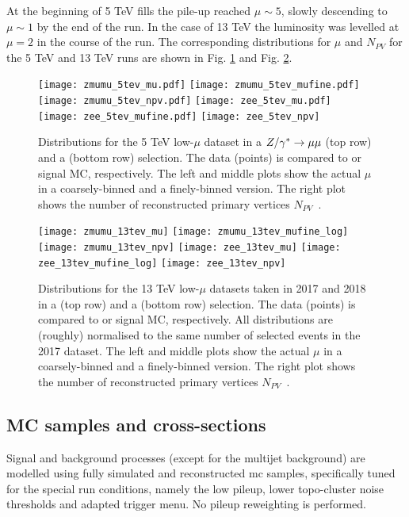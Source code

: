 	At the beginning of 5 TeV fills the pile-up reached $\mu \sim 5$, slowly descending to $\mu \sim 1$ by the end of the run. In the case of 13 TeV the luminosity was levelled at $\mu = 2$ in the course of the run. The corresponding distributions for $\mu$ and $N_{PV}$ for the 5 TeV and 13 TeV runs are shown in Fig. \ref{fig:mu5} and Fig. \ref{fig:mu13}.
	\begin{figure}[tph]
		\centering
		\texttt{[image: zmumu\_5tev\_mu.pdf]}%
		\texttt{[image: zmumu\_5tev\_mufine.pdf]}%
		\texttt{[image: zmumu\_5tev\_npv.pdf]}
		\texttt{[image: zee\_5tev\_mu.pdf]}%
		\texttt{[image: zee\_5tev\_mufine.pdf]}%
		\texttt{[image: zee\_5tev\_npv]}
		\caption{Distributions for the 5 TeV low-$\mu$ dataset in a $Z/\gamma^* \rightarrow \mu\mu$
			(top row) and a \Zgee (bottom row) selection. The data (points) is
			compared to \Zgmm or \Zgee signal MC, respectively. The left and
			middle plots show the actual $\mu$ in a coarsely-binned and a
			finely-binned version. The right plot shows the number of
			reconstructed primary vertices $N_{PV}$~\cite{int_note_samples}.}
		\label{fig:mu5}
	\end{figure}
	
	\begin{figure}[tph]
		\centering
		\texttt{[image: zmumu\_13tev\_mu]}%
		\texttt{[image: zmumu\_13tev\_mufine\_log]}%
		\texttt{[image: zmumu\_13tev\_npv]}
		\texttt{[image: zee\_13tev\_mu]}%
		\texttt{[image: zee\_13tev\_mufine\_log]}%
		\texttt{[image: zee\_13tev\_npv]}
		\caption{Distributions for the 13 TeV low-$\mu$ datasets taken in
			2017 and 2018 in a \Zgmm (top row) and a \Zgee (bottom row)
			selection. The data (points) is compared to \Zgmm or \Zgee signal
			MC, respectively. All distributions are (roughly) normalised to
			the same number of selected events in the 2017 dataset. The left
			and middle plots show the actual $\mu$ in a coarsely-binned and a
			finely-binned version. The right plot shows the number of
			reconstructed primary vertices $N_{PV}$~\cite{int_note_samples}.}
		\label{fig:mu13}
	\end{figure}
	
    \subsection{MC samples and cross-sections}
    Signal and background processes (except for the multijet background) are modelled using fully simulated and reconstructed \gls{mc} samples, specifically tuned for the special run conditions, namely the low pileup, lower topo-cluster noise thresholds and adapted trigger menu. No pileup reweighting is performed.
    
